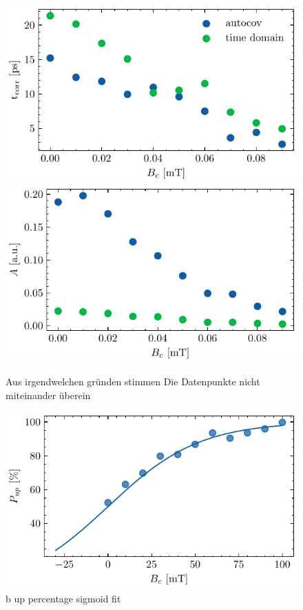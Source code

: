 \documentclass[main.tex]{subfiles}
\begin{document}



\begin{figure}[H]
    \centering
    \includegraphics{bilder/plots/max_Bz/t_corr.pdf}
    \includegraphics{bilder/plots/max_Bz/amplitude_corr.pdf}
    \caption{Aus irgendwelchen gründen stimmen Die Datenpunkte nicht miteinander überein }\label{fig:bz-autocorr-amplitude}
\end{figure}

\begin{figure}[H]
    \centering
    \includegraphics{bilder/plots/max_Bz/up_percentage_fit.pdf}
    \caption{b up percentage sigmoid fit }\label{fig:bz-up-percentage}
\end{figure}
\end{document}
